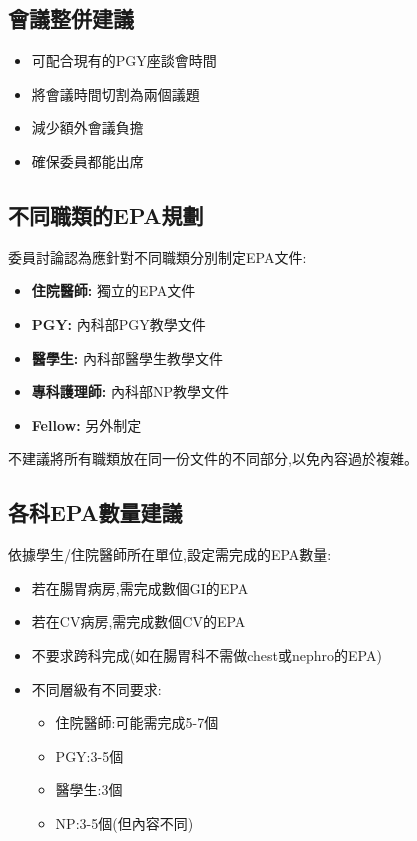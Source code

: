 \documentclass[12pt,a4paper]{article}
\begin{document}
\begin{enumerate}[leftmargin=*]
\subsection{會議整併建議}

\begin{itemize}[leftmargin=*]
    \item 可配合現有的PGY座談會時間
    \item 將會議時間切割為兩個議題
    \item 減少額外會議負擔
    \item 確保委員都能出席
\end{itemize}

\subsection{不同職類的EPA規劃}

委員討論認為應針對不同職類分別制定EPA文件:

\begin{itemize}[leftmargin=*]
    \item \textbf{住院醫師:} 獨立的EPA文件
    \item \textbf{PGY:} 內科部PGY教學文件
    \item \textbf{醫學生:} 內科部醫學生教學文件
    \item \textbf{專科護理師:} 內科部NP教學文件
    \item \textbf{Fellow:} 另外制定
\end{itemize}

不建議將所有職類放在同一份文件的不同部分,以免內容過於複雜。

\subsection{各科EPA數量建議}

依據學生/住院醫師所在單位,設定需完成的EPA數量:
\begin{itemize}[leftmargin=*]
    \item 若在腸胃病房,需完成數個GI的EPA
    \item 若在CV病房,需完成數個CV的EPA
    \item 不要求跨科完成(如在腸胃科不需做chest或nephro的EPA)
    \item 不同層級有不同要求:
    \begin{itemize}
        \item 住院醫師:可能需完成5-7個
        \item PGY:3-5個
        \item 醫學生:3個
        \item NP:3-5個(但內容不同)
    \end{itemize}
\end{itemize}


\end{enumerate}
\end{document}
